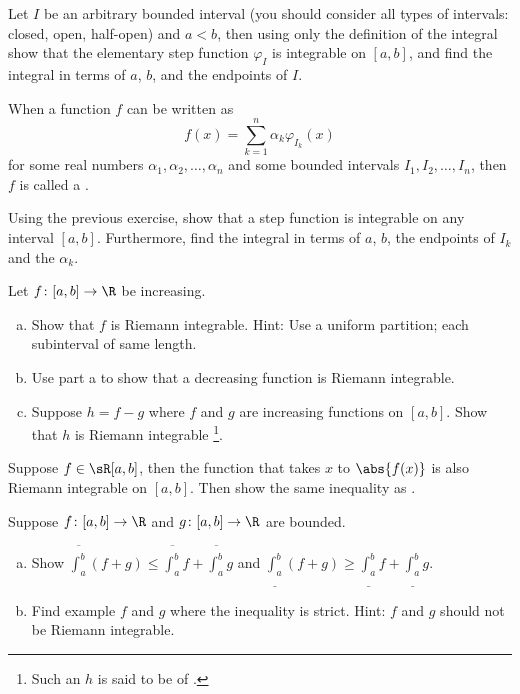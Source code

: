 \documentclass[12pt]{book}
\begin{document}
\begin{exercise}
Let $I$ be an arbitrary bounded interval (you should consider all types
of intervals: closed, open, half-open) and $a < b$, then
using only the definition of the integral
show that
the elementary step function $\varphi_I$ is integrable
on $[a,b]$, and find the integral in terms of $a$, $b$, and the
endpoints of $I$.
\end{exercise}

\begin{exnote}
When a function $f$ can be written as
\begin{equation*}
f(x) = \sum_{k=1}^n \alpha_k \varphi_{I_k} (x)
\end{equation*}
for some real numbers $\alpha_1,\alpha_2, \ldots, \alpha_n$
and some bounded intervals $I_1,I_2,\ldots,I_n$, then 
$f$ is called a \emph{}.
\end{exnote}

\begin{exercise}
Using the previous exercise, show that a step function is integrable
on any interval $[a,b]$.
Furthermore, find the integral in terms of
$a$, $b$, the endpoints of $I_k$ and the $\alpha_k$.
\end{exercise}

\begin{exercise} \label{exercise:boundedvariationintegrable}
Let $f \colon [a,b] \to \R$ be increasing.
\begin{enumerate}[a)]
 \item Show that $f$ is Riemann
integrable.
Hint: Use a uniform partition; each subinterval of same length.
  \item Use part a to show that a decreasing function is Riemann
integrable.
   \item Suppose $h = f-g$ where $f$ and $g$ are increasing
functions on $[a,b]$.
Show that $h$ is Riemann integrable%
\footnote{Such an $h$ is said to be of \emph{}.}.
\end{enumerate}
\end{exercise}

\begin{exercise}[Challenging] \label{exercise:hardabsint}
Suppose $f \in \sR[a,b]$, then the function that takes $x$ to
$\abs{f(x)}$ is also Riemann integrable on $[a,b]$.
Then show the same inequality as .
\end{exercise}

\begin{exercise}  \label{exercise:upperlowerlinineq}
Suppose $f \colon [a,b] \to \R$ and $g \colon [a,b] \to \R$
are bounded. 
\begin{enumerate}[a)]
 \item Show
$\overline{\int_a^b} (f+g) \leq \overline{\int_a^b}f+\overline{\int_a^b}g$ and
$\underline{\int_a^b} (f+g) \geq
\underline{\int_a^b}f+\underline{\int_a^b}g$.
 \item Find example $f$ and $g$ where
the inequality is strict.
Hint: $f$ and $g$ should not be Riemann
integrable.
\end{enumerate}
\end{exercise}
\end{document}
